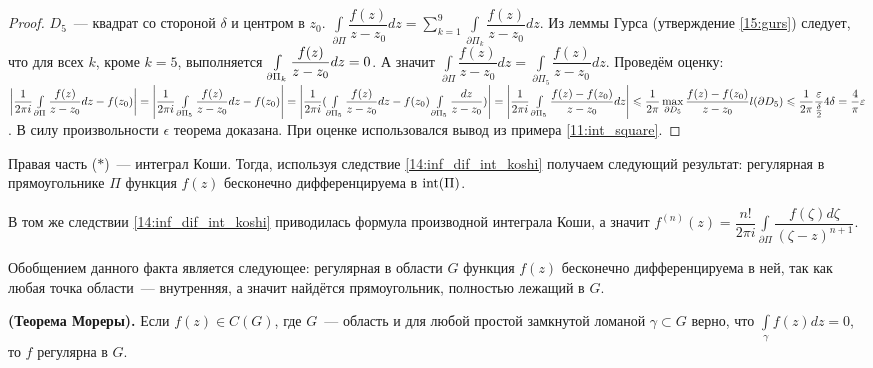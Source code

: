 \begin{proof}
\(D_5\)~--- квадрат со стороной \(\delta\) и центром в \(z_0\). \(\int\limits_{\partial\Pi}
\dfrac{f(z)}{z-z_0} dz = \sum\limits_{k=1}^9 \int\limits_{\partial \Pi_k} \dfrac{f(z)}{z-z_0} dz\).
Из леммы Гурса (утверждение \ref{15:gurs}) следует, что для всех \(k\), кроме \(k = 5\), выполняется
\(\int\limits_{\partial \Pi_k} \dfrac{f(z)}{z-z_0} dz \hm= 0\). А значит \(\int\limits_{\partial\Pi}
\dfrac{f(z)}{z-z_0} dz = \int\limits_{\partial \Pi_5} \dfrac{f(z)}{z-z_0} dz\). Проведём оценку:
\(\left|\dfrac{1}{2 \pi i} \int\limits_{\partial\Pi} \dfrac{f(z)}{z-z_0} dz - f(z_0)\right| \hm=
\left|\dfrac{1}{2 \pi i} \int\limits_{\partial\Pi_5} \dfrac{f(z)}{z-z_0} dz - f(z_0)\right| =
\left|\dfrac{1}{2 \pi i} (\int\limits_{\partial\Pi_5} \dfrac{f(z)}{z-z_0} dz - f(z_0)
\int\limits_{\partial\Pi_5} \dfrac{dz}{z-z_0})\right| \hm= \left|\dfrac{1}{2 \pi i}
\int\limits_{\partial\Pi_5} \dfrac{f(z)- f(z_0)}{z-z_0} dz\right| \le \dfrac{1}{2 \pi}
\max\limits_{\partial D_5} \dfrac{f(z) - f(z_0)}{z-z_0}l(\partial D_5) \le \dfrac{1}{2 \pi}
\dfrac{\epsilon}{\frac{\delta}{2}}4\delta = \dfrac{4}{\pi} \epsilon\). В силу произвольности
\(\epsilon\) теорема доказана. При оценке использовался вывод из примера \ref{11:int_square}.
\end{proof}

\begin{corollary} \label{16:inf_dif_reg_func}
    Правая часть (\(*\))~--- интеграл Коши. Тогда, используя следствие \ref{14:inf_dif_int_koshi}
    получаем следующий результат: регулярная в прямоугольнике \(\Pi\) функция \(f(z)\) бесконечно
    дифференцируема в \(\operatorname{int}(\Pi)\).

    В том же следствии \ref{14:inf_dif_int_koshi} приводилась формула производной интеграла Коши,
    а значит \(f^{(n)}(z) = \dfrac{n!}{2 \pi i} \int\limits_{\partial \Pi} \dfrac{f(\zeta) d\zeta}
    {(\zeta - z)^{n+1}}\).

    Обобщением данного факта является следующее: регулярная в области \(G\) функция \(f(z)\)
    бесконечно дифференцируема в ней, так как любая точка области~--- внутренняя, а значит найдётся
    прямоугольник, полностью лежащий в \(G\).
\end{corollary}

\begin{corollary}
    \textbf{(Теорема Мореры).} Если \(f(z) \in C(G)\), где \(G\)~--- область и для любой простой
    замкнутой ломаной \(\gamma \subset G\) верно, что \(\int\limits_\gamma f(z) dz = 0\), то
    \(f\) регулярна в \(G\).
\end{corollary}

